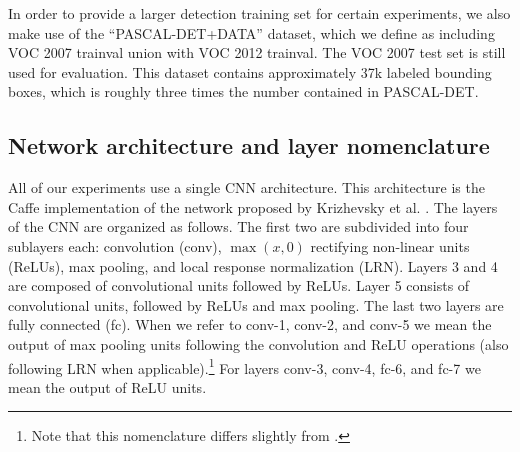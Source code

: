 In order to provide a larger detection training set for certain experiments, we also make use of the ``PASCAL-DET+DATA'' dataset, which we define as including VOC 2007 trainval union with VOC 2012 trainval.
The VOC 2007 test set is still used for evaluation.
This dataset contains approximately 37k labeled bounding boxes, which is roughly three times the number contained in PASCAL-DET.

\subsection{Network architecture and layer nomenclature}
\label{sub:net-arch}
All of our experiments use a single CNN architecture.
This architecture is the Caffe \cite{caffe} implementation of the network proposed by Krizhevsky et al. \cite{Kriz}.
The layers of the CNN are organized as follows.
The first two are subdivided into four sublayers each: convolution (conv), $\max(x,0)$ rectifying non-linear units (ReLUs), max pooling, and local response normalization (LRN). 
Layers 3 and 4 are composed of convolutional units followed by ReLUs.
Layer 5 consists of convolutional units, followed by ReLUs and max pooling.
The last two layers are fully connected (fc). 
When we refer to conv-1, conv-2, and conv-5 we mean the output of max pooling units following the convolution and ReLU operations (also following LRN when applicable).\footnote{Note that this nomenclature differs slightly from \cite{Rcnn}.}
For layers conv-3, conv-4, fc-6, and fc-7 we mean the output of ReLU units.

 
